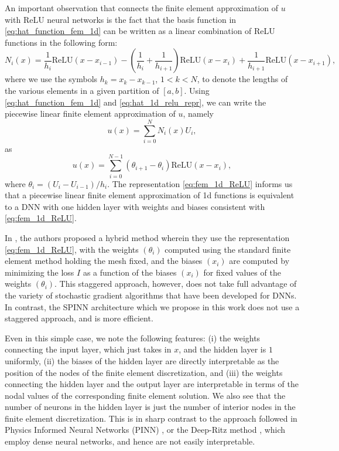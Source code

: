 \documentclass[12pt]{article}
\begin{document}
An important observation that connects the finite element approximation of $u$ with ReLU neural networks is the fact that the basis function in \eqref{eq:hat_function_fem_1d} can be written as a linear combination of ReLU functions in the following form:
\begin{equation} \label{eq:hat_1d_relu_repr}
N_i(x) = \frac{1}{h_i}\text{ReLU}(x - x_{i-1}) - \left(\frac{1}{h_i} + \frac{1}{h_{i+1}}\right)\text{ReLU}(x - x_i) + \frac{1}{h_{i+1}}\text{ReLU}(x - x_{i+1}),
\end{equation}
where we use the symbols $h_k = x_{k} - x_{k-1}$, $1 < k < N$, to denote the lengths of the various elements in a given partition of $[a,b]$. Using \eqref{eq:hat_function_fem_1d} and \eqref{eq:hat_1d_relu_repr}, we can write the piecewise linear finite element approximation of $u$, namely
\begin{equation} \label{eq:fem_approx_1d}
u(x) = \sum_{i=0}^N N_i(x) U_i,
\end{equation}
as
\begin{equation} \label{eq:fem_1d_ReLU}
u(x) = \sum_{i=0}^{N - 1} (\theta_{i+1} - \theta_i) \text{ReLU}(x - x_i),
\end{equation}
where $\theta_i = (U_i - U_{i-1})/h_i$. The representation \eqref{eq:fem_1d_ReLU} informs us that a piecewise linear finite element approximation of 1d functions is equivalent to a DNN with one hidden layer with weights and biases consistent with \eqref{eq:fem_1d_ReLU}.

In \cite{HLXZ2020}, the authors proposed a hybrid method wherein they use the representation \eqref{eq:fem_1d_ReLU}, with the weights $(\theta_i)$ computed using the standard finite element method holding the mesh fixed, and the biases $(x_i)$ are computed by minimizing the loss $I$ as a function of the biases $(x_i)$ for fixed values of the weights $(\theta_i)$. This staggered approach, however, does not take full advantage of the variety of stochastic gradient algorithms that have been developed for DNNs. In contrast, the SPINN architecture which we propose in this work does not use a staggered approach, and is more efficient. 

Even in this simple case, we note the following features: (i) the weights connecting the input layer, which just takes in $x$, and the hidden layer is $1$ uniformly, (ii) the biases of the hidden layer are directly interpretable as the position of the nodes of the finite element discretization, and (iii) the weights connecting the hidden layer and the output layer are interpretable in terms of the nodal values of the corresponding finite element solution. We also see that the number of neurons in the hidden layer is just the number of interior nodes in the finite element discretization. This is in sharp contrast to the approach followed in Physics Informed Neural Networks (PINN) \cite{RPK2019}, or the Deep-Ritz method \cite{EYu2018}, which employ dense neural networks, and hence are not easily interpretable. 
\end{document}
